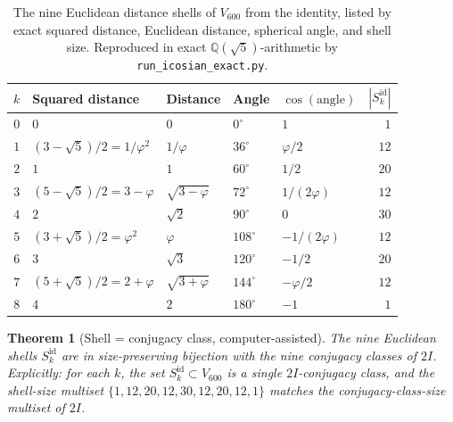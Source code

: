 \documentclass[11pt, a4paper]{amsart}
\newtheorem{theorem}{Theorem}[section]
\theoremstyle{definition}
\newcommand{\Q}{\mathbb{Q}}
\begin{document}
\begin{table}[ht]
\centering
\caption{The nine Euclidean distance shells of $V_{600}$ from the
identity, listed by exact squared distance, Euclidean distance,
spherical angle, and shell size. Reproduced in exact
$\Q(\sqrt 5)$-arithmetic by
\texttt{run\_icosian\_exact.py}.}
\label{tab:P2-shells}
\begin{tabular}{@{}cllllr@{}}
\toprule
$k$ & Squared distance & Distance & Angle & $\cos(\text{angle})$ & $|S_k^{\mathrm{id}}|$ \\
\midrule
$0$ & $0$                  & $0$              & $0^\circ$   & $1$              & $1$ \\
$1$ & $(3-\sqrt 5)/2 = 1/\varphi^2$ & $1/\varphi$     & $36^\circ$  & $\varphi/2$      & $12$ \\
$2$ & $1$                  & $1$              & $60^\circ$  & $1/2$            & $20$ \\
$3$ & $(5-\sqrt 5)/2 = 3-\varphi$ & $\sqrt{3-\varphi}$ & $72^\circ$  & $1/(2\varphi)$ & $12$ \\
$4$ & $2$                  & $\sqrt 2$        & $90^\circ$  & $0$              & $30$ \\
$5$ & $(3+\sqrt 5)/2 = \varphi^2$ & $\varphi$       & $108^\circ$ & $-1/(2\varphi)$  & $12$ \\
$6$ & $3$                  & $\sqrt 3$        & $120^\circ$ & $-1/2$           & $20$ \\
$7$ & $(5+\sqrt 5)/2 = 2+\varphi$ & $\sqrt{3+\varphi}$ & $144^\circ$ & $-\varphi/2$ & $12$ \\
$8$ & $4$                  & $2$              & $180^\circ$ & $-1$             & $1$ \\
\bottomrule
\end{tabular}
\end{table}

\begin{theorem}[Shell = conjugacy class, computer-assisted]
\label{thm:shell-class}
The nine Euclidean shells $S_k^{\mathrm{id}}$ are in size-preserving
bijection with the nine conjugacy classes of $2I$. Explicitly: for
each $k$, the set $S_k^{\mathrm{id}} \subset V_{600}$ is a single
$2I$-conjugacy class, and the shell-size multiset $\{1, 12, 20,
12, 30, 12, 20, 12, 1\}$ matches the conjugacy-class-size multiset
of $2I$.
\end{theorem}
\end{document}

